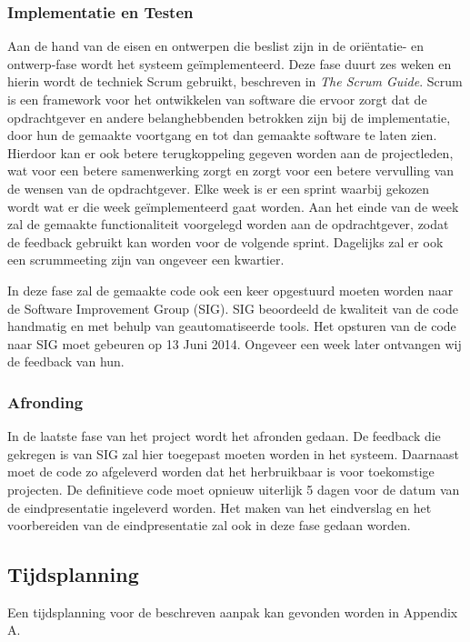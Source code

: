 \subsubsection{Implementatie en Testen}
Aan de hand van de eisen en ontwerpen die beslist zijn in de ori\"entatie- en ontwerp-fase wordt het systeem ge\"implementeerd. Deze fase duurt zes weken en hierin wordt de techniek Scrum gebruikt, beschreven in \emph{The Scrum Guide}. Scrum is een framework voor het ontwikkelen van software die ervoor zorgt dat de opdrachtgever en andere belanghebbenden betrokken zijn bij de implementatie, door hun de gemaakte voortgang en tot dan gemaakte software te laten zien. Hierdoor kan er ook betere terugkoppeling gegeven worden aan de projectleden, wat voor een betere samenwerking zorgt en zorgt voor een betere vervulling van de wensen van de opdrachtgever. Elke week is er een sprint waarbij gekozen wordt wat er die week ge\"implementeerd gaat worden. Aan het einde van de week zal de gemaakte functionaliteit voorgelegd worden aan de opdrachtgever, zodat de feedback gebruikt kan worden voor de volgende sprint. Dagelijks zal er ook een scrummeeting zijn van ongeveer een kwartier.

In deze fase zal de gemaakte code ook een keer opgestuurd moeten worden naar de Software Improvement Group (SIG). SIG beoordeeld de kwaliteit van de code handmatig en met behulp van geautomatiseerde tools. Het opsturen van de code naar SIG moet gebeuren op 13 Juni 2014. Ongeveer een week later ontvangen wij de feedback van hun.

\subsubsection{Afronding}
In de laatste fase van het project wordt het afronden gedaan. De feedback die gekregen is van SIG zal hier toegepast moeten worden in het systeem. Daarnaast moet de code zo afgeleverd worden dat het herbruikbaar is voor toekomstige projecten. De definitieve code moet opnieuw uiterlijk 5 dagen voor de datum van de eindpresentatie ingeleverd worden. Het maken van het eindverslag en het voorbereiden van de eindpresentatie zal ook in deze fase gedaan worden.

\subsection{Tijdsplanning}
Een tijdsplanning voor de beschreven aanpak kan gevonden worden in Appendix A.